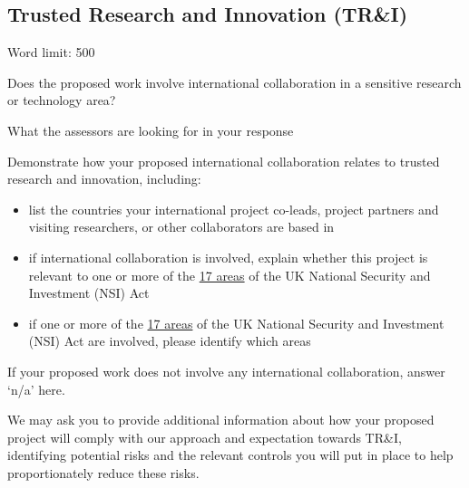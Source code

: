 \documentclass[12in]{article}
\begin{document}
\pagebreak

\subsection{Trusted Research and Innovation (TR\&I)}

{\color{red}

Word limit: 500

Does the proposed work involve international collaboration in a sensitive
research or technology area?

What the assessors are looking for in your response

Demonstrate how your proposed international collaboration relates to trusted
research and innovation, including:

\begin{itemize}

	\item list the countries your international project co-leads, project partners and
visiting researchers, or other collaborators are based in

	\item if international collaboration is involved, explain whether this project is
relevant to one or more of the \href{https://www.gov.uk/government/publications/national-security-and-investment-act-guidance-on-notifiable-acquisitions/national-security-and-investment-act-guidance-on-notifiable-acquisitions}{17 areas} of the UK National Security and
Investment (NSI) Act

	\item if one or more of the \href{https://www.gov.uk/government/publications/national-security-and-investment-act-guidance-on-notifiable-acquisitions/national-security-and-investment-act-guidance-on-notifiable-acquisitions}{17 areas} of the UK National Security and Investment
(NSI) Act are involved, please identify which areas

\end{itemize}

If your proposed work does not involve any international collaboration, answer
‘n/a’ here.

We may ask you to provide additional information about how your proposed
project will comply with our approach and expectation towards TR\&I, identifying
potential risks and the relevant controls you will put in place to help
proportionately reduce these risks.

}

\pagebreak
\end{document}
